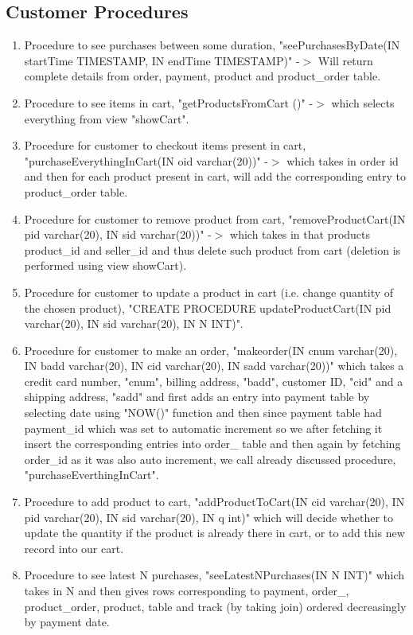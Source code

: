\documentclass[a4paper,12pt]{article}
\begin{document}
\subsection{Customer Procedures}
\begin{enumerate}
  \item Procedure to see purchases between some duration, "seePurchasesByDate(IN startTime TIMESTAMP, IN endTime TIMESTAMP)" -$>$ Will return complete details from order, payment, product and product\_order table.
  \item Procedure to see items in cart, "getProductsFromCart ()" -$>$ which selects everything from view "showCart".
  \item Procedure for customer to checkout items present in cart, "purchaseEverythingInCart(IN oid varchar(20))" -$>$ which takes in order id and then for each product present in cart, will add the corresponding entry to product\_order table.
  \item Procedure for customer to remove product from cart, "removeProductCart(IN pid varchar(20), IN sid varchar(20))" -$>$ which takes in that products product\_id and seller\_id and thus delete such product from cart (deletion is performed using view showCart).
  \item Procedure for customer to update a product in cart (i.e. change quantity of the chosen product), "CREATE PROCEDURE updateProductCart(IN pid varchar(20), IN sid varchar(20), IN N INT)".
  \item Procedure for customer to make an order, "makeorder(IN cnum varchar(20), IN badd varchar(20), IN cid varchar(20), IN sadd varchar(20))" which takes a credit card number, "cnum", billing address, "badd", customer ID, "cid" and a shipping address, "sadd" and first adds an entry into payment table by selecting date using "NOW()" function and then since payment table had payment\_id which was set to automatic increment so we after fetching it insert the corresponding entries into order\_ table and then again by fetching order\_id as it was also auto increment, we call already discussed procedure, "purchaseEverthingInCart".
  \item Procedure to add product to cart, "addProductToCart(IN cid varchar(20), IN pid varchar(20), IN sid varchar(20), IN q int)" which will decide whether to update the quantity if the product is already there in cart, or to add this new record into our cart.
  \item Procedure to see latest N purchases, "seeLatestNPurchases(IN N INT)" which takes in N and then gives rows corresponding to payment, order\_, product\_order, product, table and track (by taking join) ordered decreasingly by payment date.

\end{enumerate}
\end{document}
